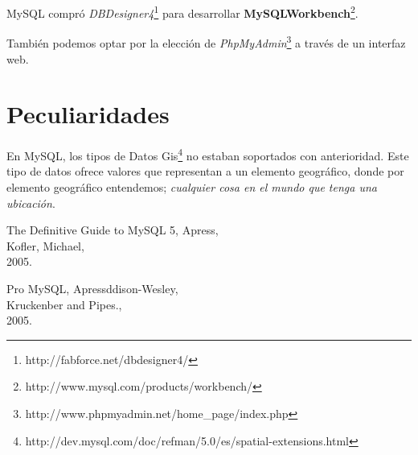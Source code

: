 \documentclass[11pt]{article}
\begin{document}
\par MySQL compr\'o \emph{DBDesigner4}\footnote{http://fabforce.net/dbdesigner4/} para desarrollar \textbf{MySQLWorkbench}\footnote{http://www.mysql.com/products/workbench/}.

Tambi\'en podemos optar por la elecci\'on de \emph{PhpMyAdmin}\footnote{http://www.phpmyadmin.net/home\_page/index.php} a trav\'es de un interfaz web.

\section{Peculiaridades}
\label{sec:peculiaridades}

\par En MySQL, los tipos de Datos Gis\footnote{http://dev.mysql.com/doc/refman/5.0/es/spatial-extensions.html} no estaban soportados con anterioridad. Este tipo de datos ofrece valores que representan a un elemento geogr\'afico, donde por elemento geogr\'afico entendemos; \emph{cualquier cosa en el mundo que tenga una ubicaci\'on}.

\begin{thebibliography}{9}

    The Definitive Guide to MySQL 5, Apress,\\
    Kofler, Michael,\\
    2005.

    Pro MySQL, Apressddison-Wesley,\\
    Kruckenber and Pipes.,\\ 
    2005.

\end{thebibliography}
\end{document}
